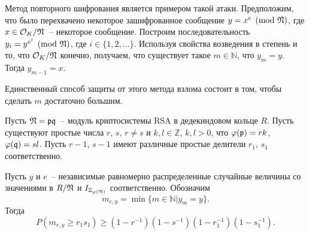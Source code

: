 \documentclass[_00_dissertation.tex]{subfiles}
\begin{document}
Метод повторного шифрования является примером такой атаки.
Предположим, что было перехвачено некоторое зашифрованное сообщение $y = x^e \pmod{\mathfrak{N}}$, где $x \in \mathcal{O}_K / \mathfrak{N}$~-- некоторое сообщение.
Построим последовательность $y_i = y^{e^i} \pmod{\mathfrak{N}}$, где $i \in \{1, 2, \ldots\}$.
Используя свойства возведения в степень и то, что $\mathcal{O}_K / \mathfrak{N}$ конечно, получаем, что существует такое $m \in \mathbb{N}$, что $y_m = y$.
Тогда $y_{m-1} = x$.

Единственный способ защиты от этого метода взлома состоит в том, чтобы сделать $m$ достаточно большим.

\begin{theorem}\label{theorem:iterated}
    Пусть $\mathfrak{N} = \mathfrak{p} \mathfrak{q}$~-- модуль криптосистемы RSA в дедекиндовом кольце $R$.
    Пусть существуют простые числа $r$, $s$, $r \neq s$ и $k, l \in \mathbb{Z}$, $k, l > 0$, что $\varphi(\mathfrak{p}) = rk$, $\varphi(\mathfrak{q}) = sl$.
    Пусть $r - 1$, $s - 1$ имеют различные простые делители $r_1$, $s_1$ соответственно.

    Пусть $y$ и $e$~-- независимые равномерно распределенные случайные величины со значениями в $R / \mathfrak{N}$ и $I_{\mathbb{Z}_{\varphi(\mathfrak{N})}}$ соответственно.
    Обозначим
    \begin{equation*}
        m_{e,y} = \min \{m \in \mathbb{N} | y_m = y\}.
    \end{equation*}
    Тогда
    \begin{equation*}
        P(m_{e,y} \ge r_1s_1)\ge(1-r^{-1})(1-s^{-1})(1-r_1^{-1})(1-s_1^{-1}).
    \end{equation*}
\end{theorem}
\end{document}
